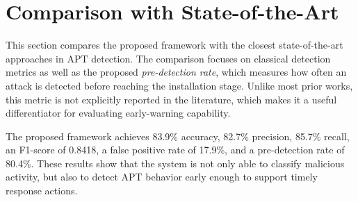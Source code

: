 \section{Comparison with State-of-the-Art}
\label{sec:sota-comparison}

This section compares the proposed framework with the closest state-of-the-art approaches in APT detection. The comparison focuses on classical detection metrics as well as the proposed \textit{pre-detection rate}, which measures how often an attack is detected before reaching the installation stage. Unlike most prior works, this metric is not explicitly reported in the literature, which makes it a useful differentiator for evaluating early-warning capability.

The proposed framework achieves 83.9\% accuracy, 82.7\% precision, 85.7\% recall, an F1-score of 0.8418, a false positive rate of 17.9\%, and a pre-detection rate of 80.4\%. These results show that the system is not only able to classify malicious activity, but also to detect APT behavior early enough to support timely response actions.

